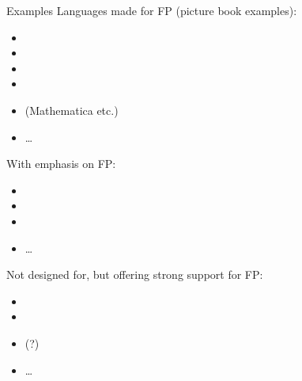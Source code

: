 \begin{frame}{Examples}
	Languages made for FP (picture book examples):
	\begin{itemize}
		\item {}
		\item {}
		\item {}
		\item {}
		\item {} (Mathematica etc.)
		\item \dots
	\end{itemize}
	With emphasis on FP:
	\begin{itemize}
		\item {}
		\item {}
		\item {}
		\item \dots
	\end{itemize}
	Not designed for, but offering strong support for FP:
	\begin{itemize}
		\item {} 
		\item {}
		\item {} (?)  
		\item \dots
	\end{itemize}
\end{frame}

%	
%

